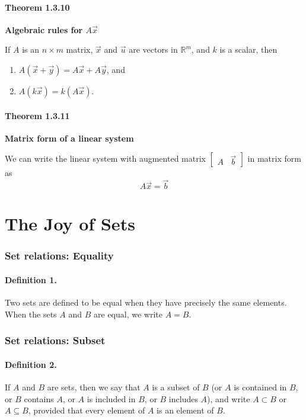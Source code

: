 \documentclass{report}
\begin{document}
\subsubsection*{Theorem 1.3.10}
\par\noindent\textbf{Algebraic rules for $A\vec{x}$}
\par\noindent If $A$ is an $n\times{}m$ matrix, $\vec{x}$ and $\vec{u}$ are vectors in $\mathbb{R}^{m}$, and $k$ is a scalar, then
\renewcommand{\labelenumi}{\textbf{\alph{enumi}.}}
\begin{enumerate}
\item $A(\vec{x}+\vec{y})=A\vec{x}+A\vec{y}$, and
\item $A(k\vec{x})=k(A\vec{x})$.
\end{enumerate}
\subsubsection*{Theorem 1.3.11}
\par\noindent\textbf{Matrix form of a linear system}
\par\noindent We can write the linear system with augmented matrix $\left[\begin{array}{c|c}A & \vec{b}\end{array}\right]$ in matrix form as
\[A\vec{x}=\vec{b}\]

\pagebreak

\chapter*{The Joy of Sets}
\subsection*{Set relations: Equality}
\subsubsection*{Definition 1.}
\par\noindent Two sets are defined to be equal when they have precisely the same elements. When the sets $A$ and $B$ are equal, we write $A=B$.
\subsection*{Set relations: Subset}
\subsubsection*{Definition 2.}
\par\noindent If $A$ and $B$ are sets, then we say that $A$ is a subset of $B$ (or $A$ is contained in $B$, or $B$ contains $A$, or $A$ is included in $B$, or $B$ includes $A$), and write $A\subset{}B$ or $A\subseteq{}B$, provided that every element of $A$ is an element of $B$.
\end{document}
